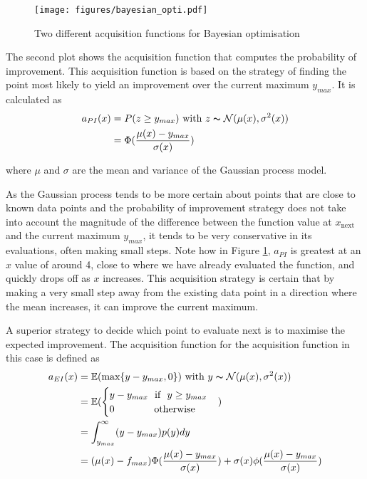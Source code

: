 \documentclass[a4paper,12pt,twoside,openright]{report}
\begin{document}
\begin{figure}
\centering
  \texttt{[image: figures/bayesian\_opti.pdf]}
  \caption{Two different acquisition functions for Bayesian optimisation}
  \label{bayesianopti}
\end{figure}

The second plot shows the acquisition function that computes the probability of improvement. This acquisition function is based on the strategy of finding the point most likely to yield an improvement over the current maximum $y_{max}$. It is calculated as
\begin{align}
a_{PI}(x) &= P(z \geq y_{max}) \text{\ with\ } z \thicksim \mathcal{N}(\mu(x),\sigma^2(x))\label{eq:pi_equation}\\
&=\Phi(\frac{\mu(x) - y_{max}}{\sigma(x)})
\end{align}

where $\mu$ and $\sigma$ are the mean and variance of the Gaussian process model.

As the Gaussian process tends to be more certain about points that are close to known data points and the probability of improvement strategy does not take into account the magnitude of the difference between the function value at $x_{\text{next}}$ and the current maximum $y_{max}$, it tends to be very conservative in its evaluations, often making small steps. Note how in Figure \ref{bayesianopti}, $a_{PI}$ is greatest at an $x$ value of around 4, close to where we have already evaluated the function, and quickly drops off as $x$ increases. This acquisition strategy is certain that by making a very small step away from the existing data point in a direction where the mean increases, it can improve the current maximum.

A superior strategy to decide which point to evaluate next is to maximise the expected improvement. The acquisition function for the acquisition function in this case is defined \cite{eipaper} as
\begin{align}
a_{EI}(x) &= \mathbb{E}(\text{max}\{y - y_{max}, 0\}) \text{\ with\ } y \thicksim \mathcal{N}(\mu(x),\sigma^2(x))\\
&= \mathbb{E}(\begin{cases}
        y-y_{max} \text{\ \ if\ \ } y \geq y_{max}
        \\
        0 \text{\ \ \ \ \ \ \ \ \ \ \ \ otherwise}
        \end{cases})\\
&= \int_{y_{max}}^\infty (y-y_{max})p(y)dy\\
&= (\mu(x) - f_{max})\Phi(\frac{\mu(x) - y_{max}}{\sigma(x)}) + \sigma(x)\phi(\frac{\mu(x) - y_{max}}{\sigma(x)})
\end{align}
\end{document}
